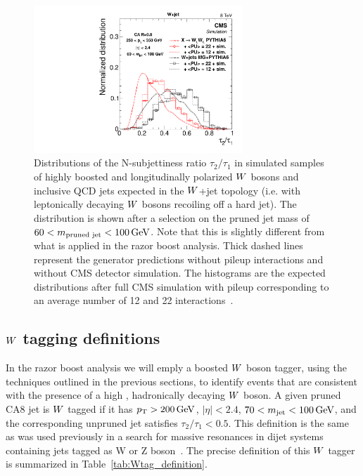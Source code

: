 \begin{figure}[htpb]
  \centering
  \includegraphics[width=0.7\textwidth]{figures/razor_wtag/tau2tau1_afterMass}
  \caption{Distributions of the N-subjettiness ratio $\tau_2 / \tau_1$ in simulated samples of
highly boosted and longitudinally polarized $W$ bosons and inclusive QCD jets expected in the
$W$+jet topology (i.e. with leptonically decaying $W$ bosons recoiling off a hard jet). 
The distribution is shown after a selection on the pruned jet mass of $60 < m_{\textrm{pruned jet}}
< 100 \,\text{Ge\hspace{-.08em}V}$. Note that this is slightly different from what is applied in the razor boost analysis.
Thick dashed lines represent the generator predictions without pileup interactions and without CMS
detector simulation. The histograms are the expected distributions after full CMS simulation with
pileup corresponding to an average number of 12 and 22 interactions~\cite{Khachatryan:2014vla}. 
  \label{fig:boost_wtag_tau2tau1}}
\end{figure}



\subsection{\texorpdfstring{$W$}{W} tagging definitions}

In the razor boost analysis we will emply a boosted $W$ boson tagger, using the techniques
outlined in the previous sections, to identify events that are consistent with the presence of a
high \pt, hadronically decaying $W$ boson. 
A given pruned CA8 jet is $W$ tagged if it has $p_{\mathrm{T}} > 200\,\text{Ge\hspace{-.08em}V}$, $|\eta|<2.4$, $70 < m_\textrm{jet}
< 100\,\text{Ge\hspace{-.08em}V}$, and the corresponding unpruned jet satisfies $\tau_2 / \tau_1 < 0.5$.
This definition is the same as was used previously in a search for massive resonances in dijet
systems containing jets tagged as W or Z boson~\cite{EXO-12-024,EXO-13-009}. 
The precise definition of this $W$ tagger is summarized in Table~\ref{tab:Wtag_definition}.

